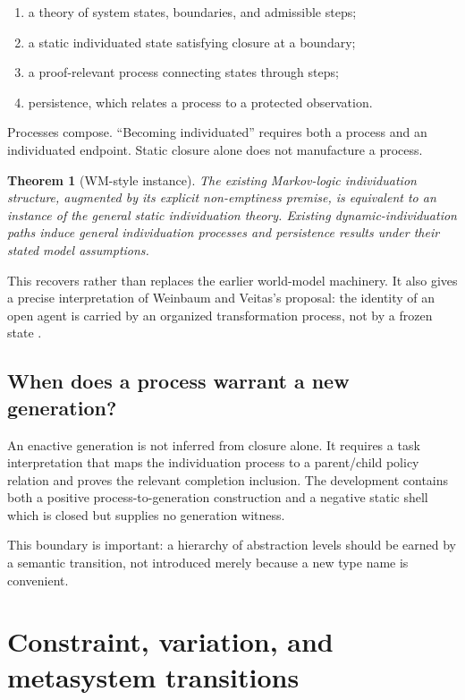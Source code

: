 \documentclass[11pt]{article}
\newtheorem{theorem}{Theorem}[section]
\begin{document}
\begin{enumerate}
\item a theory of system states, boundaries, and admissible steps;
\item a static individuated state satisfying closure at a boundary;
\item a proof-relevant process connecting states through steps;
\item persistence, which relates a process to a protected observation.
\end{enumerate}

Processes compose.  ``Becoming individuated'' requires both a process and an
individuated endpoint.  Static closure alone does not manufacture a process.

\begin{theorem}[WM-style instance]
The existing Markov-logic individuation structure, augmented by its explicit
non-emptiness premise, is equivalent to an instance of the general static
individuation theory.  Existing dynamic-individuation paths induce general
individuation processes and persistence results under their stated model assumptions.
\end{theorem}

This recovers rather than replaces the earlier world-model machinery.  It also gives
a precise interpretation of Weinbaum and Veitas's proposal: the identity of an open
agent is carried by an organized transformation process, not by a frozen state
\cite{weinbaumveitas2015,weinbaum2018}.

\subsection{When does a process warrant a new generation?}

An enactive generation is not inferred from closure alone.  It requires a task
interpretation that maps the individuation process to a parent/child policy relation
and proves the relevant completion inclusion.  The development contains both a
positive process-to-generation construction and a negative static shell which is
closed but supplies no generation witness.

This boundary is important: a hierarchy of abstraction levels should be earned by a
semantic transition, not introduced merely because a new type name is convenient.

\section{Constraint, variation, and metasystem transitions}
\end{document}
